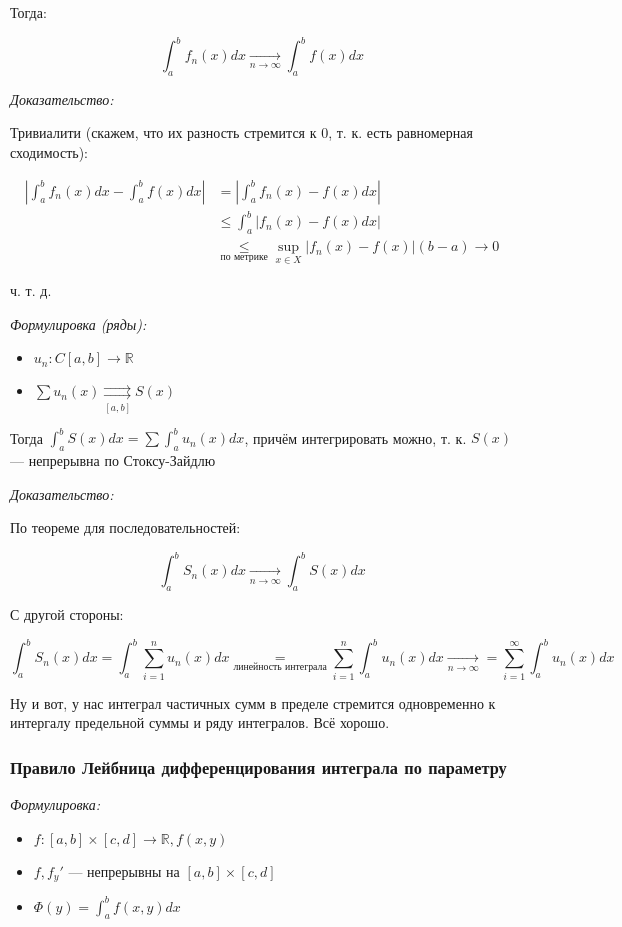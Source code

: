 \documentclass{article}
\def\rsh#1{\underset{#1}{\rightrightarrows}}
\begin{document}
Тогда:

\[\int_a^b{f_n(x)dx} \underset{n \rightarrow \infty}{\longrightarrow} \int_a^b{f(x)dx}\]

\textit{Доказательство:}

Тривиалити (скажем, что их разность стремится к 0, т. к. есть равномерная сходимость): 

\begin{align*}
    \left|\int_a^b{f_n(x)dx} - \int_a^b{f(x)dx}\right|
 &=  \left|\int_a^b{f_n(x) - f(x)dx}\right| \\
  &\le \int_a^b \left|f_n(x) - f(x) dx\right| \\ 
  &\underset{\text{по метрике}}{\le} {\sup_{x \in X} \left|f_n(x) - f(x)\right|}(b - a) \rightarrow 0
\end{align*}

ч. т. д.

\textit{Формулировка (ряды):}

\begin{itemize}
    \item $u_n: C[a, b] \rightarrow \mathbb{R}$
    \item $\sum u_n(x) \rsh{[a, b]} S(x)$
\end{itemize}

Тогда $\int_a^bS(x)dx =\sum \int_a^b u_n(x) dx$, причём интегрировать можно, т. к. $S(x)$ --- непрерывна по Стоксу-Зайдлю

\textit{Доказательство:}

По теореме для последовательностей: 

\[\int_a^b S_n(x) dx \underset{n \rightarrow \infty}{\longrightarrow} \int_a^b S(x) dx\]

С другой стороны:

\[\int_a^b S_n(x) dx = \int_a^b \sum_{i = 1}^n u_n(x) dx \underset{\text{линейность интеграла}}{=} \sum_{i = 1}^n \int_a^b u_n(x) dx \underset{n \rightarrow \infty}{\longrightarrow} = \sum_{i = 1}^{\infty} \int_a^b u_n(x) dx\]

Ну и вот, у нас интеграл частичных сумм в пределе стремится одновременно к интергалу предельной суммы и ряду интегралов. Всё хорошо.

\subsubsection{Правило Лейбница дифференцирования интеграла по параметру}
\textit{Формулировка:}

\begin{itemize}
    \item $f: [a, b] \times [c, d] \rightarrow \mathbb{R}, f(x, y)$
    \item $f, f_y'$ --- непрерывны на $[a, b] \times [c, d]$
    \item $\Phi(y) = \int_a^b f(x, y) dx$
\end{itemize}
\end{document}
